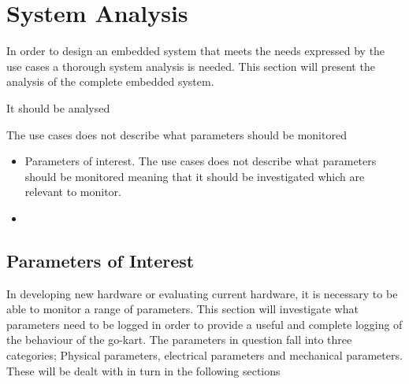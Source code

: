 \section{System Analysis} %
\label{sec:system_analysis}
In order to design an embedded system that meets the needs expressed by the use cases a thorough system analysis is needed. 
This section will present the analysis of the complete embedded system.

It should be analysed 

The use cases does not describe what parameters should be monitored 

\begin{itemize}
\item Parameters of interest. The use cases does not describe what parameters should be monitored meaning that it should be investigated which are relevant to monitor.
\item 
\end{itemize}

\subsection{Parameters of Interest}
\label{sec:parameters}
In developing new hardware or evaluating current hardware, it is necessary to be able to monitor a range of parameters.
This section will investigate what parameters need to be logged in order to provide a useful and complete logging of the behaviour of the go-kart.
The parameters in question fall into three categories; Physical parameters, electrical parameters and mechanical parameters.
These will be dealt with in turn in the following sections
